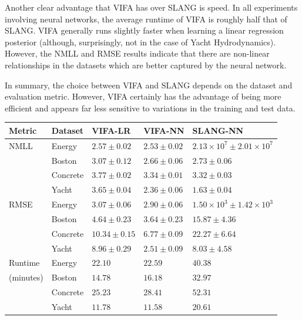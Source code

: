 \documentclass[msc,deptreport.inf]{infthesis} %
\begin{document}
Another clear advantage that VIFA has over SLANG is speed. In all experiments involving neural networks, the average runtime of VIFA is roughly half that of SLANG. VIFA generally runs slightly faster when learning a linear regression posterior (although, surprisingly, not in the case of Yacht Hydrodynamics). However, the NMLL and RMSE results indicate that there are non-linear relationships in the datasets which are better captured by the neural network. 

In summary, the choice between VIFA and SLANG depends on the dataset and evaluation metric. However, VIFA certainly has the advantage of being more efficient and appears far less sensitive to variations in the training and test data. 

\begin{table}[h!]
	\begin{center}
		\begin{tabular}{@{} lllll @{}} 
 			\toprule
 			Metric & Dataset & VIFA-LR & VIFA-NN & SLANG-NN \\
 			\midrule
			NMLL 	& Energy 		& $\mathbf{2.57 \pm 0.02}$ 	& $\mathbf{2.53 \pm 0.02}$ 	& $2.13 \times 10^{7} \pm 2.01 \times 10^{7}$ \\ 	
			   		& Boston   	& $3.07 \pm 0.12$			& $\mathbf{2.66 \pm 0.06}$ 	& $\mathbf{2.73 \pm 0.06}$ \\ 			
			  		& Concrete	& $3.77 \pm 0.02$ 			& $\mathbf{3.34 \pm 0.01}$ 	& $\mathbf{3.32 \pm 0.03}$ \\ 			
 					& Yacht    		& $3.65 \pm 0.04$ 			& $2.36 \pm 0.06$ 			& $\mathbf{1.63 \pm 0.04}$ \\
 			\midrule
			RMSE 	& Energy 	 	& $3.07 \pm 0.06$  			& $\mathbf{2.90 \pm 0.06}$ 	& $1.50 \times 10^{3} \pm 1.42 \times 10^{3}$ \\ 
					& Boston 	 	& $4.64 \pm 0.23$ 			& $\mathbf{3.64 \pm 0.23}$ 	& $15.87 \pm 4.36$ \\ 
					& Concrete  	& $10.34 \pm 0.15$ 			& $\mathbf{6.77 \pm 0.09}$ 	& $22.27 \pm 6.64$ \\ 
 					& Yacht 		& $8.96 \pm 0.29$ 			& $\mathbf{2.51 \pm 0.09}$ 	& $8.03 \pm 4.58$ \\ 
			\midrule			
			Runtime 	& Energy 	 	& $\mathbf{22.10}$   		& $22.59$  				& $40.38$  \\ 
			(minutes)	& Boston 	 	& $\mathbf{14.78}$			& $16.18$					& $32.97$ \\ 
					& Concrete 	& $\mathbf{25.23}$			& $28.41$					& $52.31$ \\ 
 					& Yacht 		& $11.78$					& $\mathbf{11.58}$			& $20.61$\\

\end{tabular}
\end{center}
\end{table}
\end{document}
